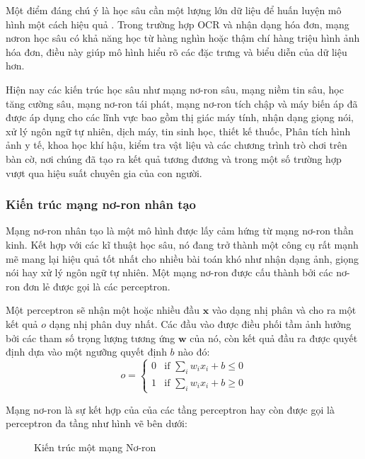 Một điểm đáng chú ý là học sâu cần một lượng lớn dữ liệu để huấn luyện mô hình một cách hiệu quả \cite{wiki-deep-learning}. Trong trường hợp OCR và nhận dạng hóa đơn, mạng nơron học sâu có khả năng học từ hàng nghìn hoặc thậm chí hàng triệu hình ảnh hóa đơn, điều này giúp mô hình hiểu rõ các đặc trưng và biểu diễn của dữ liệu hơn.

Hiện nay các kiến trúc học sâu như mạng nơ-ron sâu, mạng niềm tin sâu, học tăng cường sâu, mạng nơ-ron tái phát, mạng nơ-ron tích chập và máy biến áp đã được áp dụng cho các lĩnh vực bao gồm thị giác máy tính, nhận dạng giọng nói, xử lý ngôn ngữ tự nhiên, dịch máy, tin sinh học, thiết kế thuốc, Phân tích hình ảnh y tế, khoa học khí hậu, kiểm tra vật liệu và các chương trình trò chơi trên bàn cờ, nơi chúng đã tạo ra kết quả tương đương và trong một số trường hợp vượt qua hiệu suất chuyên gia của con người.

\subsubsection{Kiến trúc mạng nơ-ron nhân tạo}
Mạng nơ-ron nhân tạo là một mô hình được lấy cảm hứng từ mạng nơ-ron thần kinh. Kết hợp với các kĩ thuật học sâu, nó đang trở thành một công cụ rất mạnh mẽ mang lại hiệu quả tốt nhất cho nhiều bài toán khó như nhận dạng ảnh, giọng nói hay xử lý ngôn ngữ tự nhiên. Một mạng nơ-ron được cấu thành bởi các nơ-ron đơn lẻ được gọi là các perceptron.

Một perceptron sẽ nhận một hoặc nhiều đầu $\mathbf{x}$ vào dạng nhị phân và cho ra một kết quả $o$ dạng nhị phân duy nhất. Các đầu vào được điều phối tầm ảnh hưởng bởi các tham số trọng lượng tương ứng $\mathbf{w}$ của nó, còn kết quả đầu ra được quyết định dựa vào một ngưỡng quyết định $b$ nào đó:
$$o = \begin{cases}
        0 & \text{if } \sum_i w_i x_i +b \leq 0 \\
        1 & \text{if } \sum_i w_i x_i +b \ge 0
    \end{cases}$$

Mạng nơ-ron là sự kết hợp của của các tầng perceptron hay còn được gọi là perceptron đa tầng như hình vẽ bên dưới:
\begin{figure}[h]
    
    \centering
    \caption{Kiến trúc một mạng Nơ-ron}

\end{figure}

